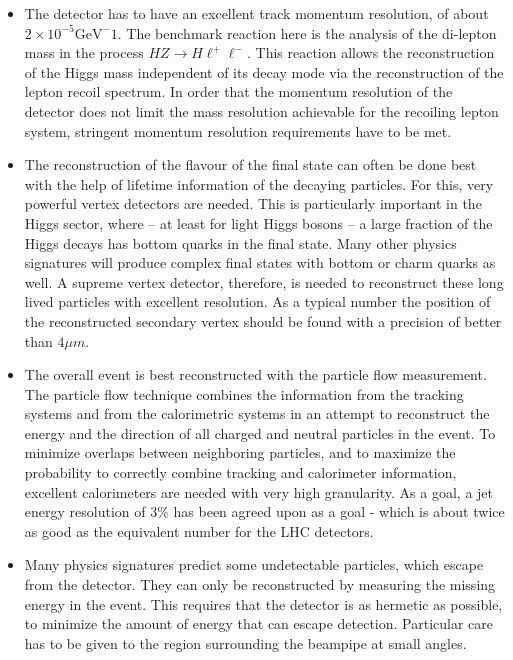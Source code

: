 \documentclass[%
 reprint,
 amsmath,amssymb,
 aps,
]{revtex4-1}
\begin{document}
 
\begin{itemize}
 \item The detector has to have an excellent track momentum
   resolution, of about $2 \times 10^{-5} \mathrm{GeV}^-1$. The benchmark reaction here is the analysis 
of the di-lepton mass in the process $HZ \to H \ell^+
\ell^-$. This reaction allows the reconstruction of the 
Higgs mass independent of its decay mode via the 
reconstruction of the lepton recoil spectrum. In order that 
the momentum resolution of the detector does not limit 
the mass resolution achievable for the recoiling lepton 
system, stringent momentum resolution requirements have to be met. 
\item The reconstruction of the flavour of the final state can 
often be done best with the help of lifetime information of the 
decaying particles. For this, very powerful vertex detectors 
are needed. This is particularly important 
in the Higgs sector, where -- at least for light Higgs bosons -- 
a large fraction of the Higgs decays has bottom 
quarks in the final state. Many other physics signatures will 
produce complex final states with bottom or charm quarks as well. 
A supreme vertex detector, therefore, is needed to reconstruct these 
long lived particles with excellent resolution. As a typical number the position of the reconstructed secondary vertex should be found with a precision of better than $4 \mu m$. 
\item The overall event is best reconstructed with the 
particle flow measurement. The particle flow technique combines 
the information from the tracking systems and from the 
calorimetric systems in an attempt to reconstruct the 
energy and the direction of all charged and 
neutral particles in the event. To minimize overlaps between 
neighboring particles, and to maximize the probability to 
correctly combine tracking and calorimeter information, 
excellent calorimeters are needed with very high granularity. As a goal, a jet energy resolution of $3 \%$ has been agreed upon as a goal - which is about twice as good as the equivalent number for the LHC detectors. 
\item Many physics signatures predict some undetectable particles, 
which escape from the detector. They can only be reconstructed by 
measuring the missing energy in the event. This requires 
that the detector is as hermetic as possible, to 
minimize the amount of energy that can escape detection. 
Particular care has to be given to the region surrounding the 
beampipe at small angles. 
\end{itemize}
\end{document}
